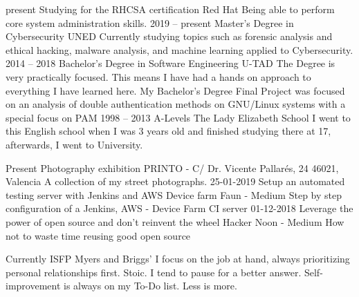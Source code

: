 \documentclass[9pt]{developercv} %
\begin{document}


\begin{entrylist}
	\entry
	  {present}
	  {Studying for the RHCSA certification}
    {Red Hat}
    {Being able to perform core system administration skills.}
	\entry
	  {2019 -- present}
	  {Master's Degree in Cybersecurity}
    {UNED}
    {Currently studying topics such as forensic analysis and ethical hacking, malware analysis, and machine learning applied to Cybersecurity.}
	\entry
		{2014 -- 2018}
		{Bachelor's Degree in Software Engineering}
		{U-TAD}
		{The Degree is very practically focused. This means I have had a hands on approach to everything I have learned here.
		My Bachelor's Degree Final Project was focused on an analysis of double authentication methods on GNU/Linux systems with a special focus on PAM}
	\entry
		{1998 -- 2013}
		{A-Levels}
		{The Lady Elizabeth School}
		{I went to this English school when I was 3 years old and finished studying there at 17, afterwards, I went to University.}
\end{entrylist}


\begin{entrylist}
	\entry
	  {Present}
    {Photography exhibition}
    {PRINTO - C/ Dr. Vicente Pallarés, 24 46021, Valencia}
    {A collection of my street photographs.}
  \entry
		{25-01-2019}
		{Setup an automated testing server with Jenkins and AWS Device farm}
		{Faun - Medium}
		{Step by step configuration of a Jenkins, AWS - Device Farm CI server}
	\entry
		{01-12-2018}
		{Leverage the power of open source and don’t reinvent the wheel}
		{Hacker Noon - Medium}
    {How not to waste time reusing good open source}
\end{entrylist}
\newpage


\begin{entrylist}
	\entry
		{Currently}
		{ISFP}
		{Myers and Briggs'}
		{I focus on the job at hand, always prioritizing personal relationships first.
		Stoic.
		I tend to pause for a better answer.
		Self-improvement is always on my To-Do list.
		Less is more.}
\end{entrylist}
\end{document}
